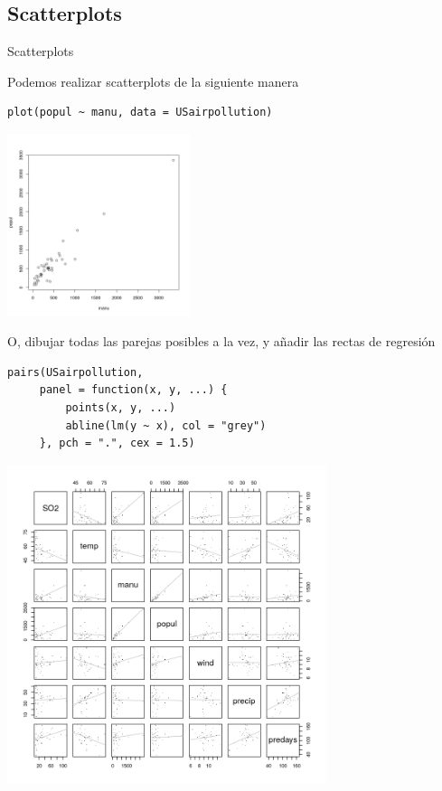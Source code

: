 \documentclass[xcolor=table]{beamer}
\begin{document}
\subsection{Scatterplots}
\begin{frame}[fragile]{Scatterplots}

Podemos realizar scatterplots de la siguiente manera



\begin{lstlisting}
plot(popul ~ manu, data = USairpollution)
\end{lstlisting}
\centering
\includegraphics[width=0.4\textwidth]{scatter.png}



\end{frame}
\begin{frame}[fragile]
O, dibujar todas las parejas posibles a la vez, y añadir las rectas de regresión

\begin{lstlisting}
pairs(USairpollution,
     panel = function(x, y, ...) {
         points(x, y, ...)
         abline(lm(y ~ x), col = "grey")
     }, pch = ".", cex = 1.5)
\end{lstlisting}
\end{frame}
\begin{frame}
\centering
\includegraphics[width=0.7\textwidth]{reg.png}
\end{frame}
\end{document}
